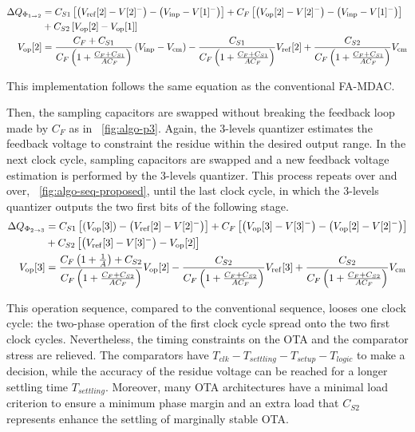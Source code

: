 \begin{align}
 \Delta Q_{\Phi_{1 \rightarrow 2}} &= C_{S1} \left[\left(V_{\rm ref}[2]-V[2]^- \right) - \left(V_{\rm inp}-V[1]^- \right) \right] + C_{F} \left[\left(V_{\rm op}[2]-V[2]^- \right) - \left(V_{\rm inp}-V[1]^- \right) \right] \\
 &+ C_{S2} \left[V_{\rm op}[2]-V_{\rm op}[1] \right] \nonumber \\
 V_{\rm op}[2] &= \frac{C_F + C_{S1}}{C_F\left(1+\frac{C_F+C_{S1}}{AC_F} \right)} \left(V_{\rm inp}-V_{\rm cm} \right) - \frac{C_{S1}}{C_F\left(1+\frac{C_F+C_{S1}}{AC_F} \right)} V_{\rm ref}[2] + \frac{C_{S2}}{C_F\left(1+\frac{C_F+C_{S1}}{AC_F} \right)} V_{\rm cm}
 \label{eqn:algo_res_p2}
\end{align}

This implementation follows the same equation as the conventional FA-MDAC\@.

Then, the sampling capacitors are swapped without breaking the feedback loop made by \(C_F\) as in \figurename~\ref{fig:algo-p3}. Again, the 3-levels quantizer estimates the feedback voltage to constraint the residue within the desired output range. In the next clock cycle, sampling capacitors are swapped and a new feedback voltage estimation is performed by the 3-levels quantizer. This process repeats over and over, \figurename~\ref{fig:algo-seq-proposed}, until the last clock cycle, in which the 3-levels quantizer outputs the two first bits of the following stage.
\rm
\begin{align}
	\Delta Q_{\Phi_{2 \rightarrow 3}} &= C_{S1} \left[\left(V_{\rm op}[3] \right) - \left(V_{\rm ref}[2]-V[2]^- \right) \right] + C_{F} \left[\left(V_{\rm op}[3]-V[3]^- \right) - \left(V_{\rm op}[2]-V[2]^- \right) \right] \\
	&+ C_{S2} \left[\left(V_{\rm ref}[3] - V[3]^- \right) - V_{\rm op}[2] \right] \nonumber \\
	V_{\rm op}[3] &= \frac{C_F\left(1+\frac{1}{A}\right) + C_{S2}}{C_F\left(1+\frac{C_F+C_{S2}}{AC_F} \right)} V_{\rm op}[2] - \frac{C_{S2}}{C_F\left(1+\frac{C_F+C_{S2}}{AC_F} \right)} V_{\rm ref}[3] + \frac{C_{S2}}{C_F\left(1+\frac{C_F+C_{S2}}{AC_F} \right)} V_{\rm cm}
	\label{eqn:algo_res_p3}
   \end{align}

This operation sequence, compared to the conventional sequence, looses one clock cycle: the two-phase operation of the first clock cycle spread onto the two first clock cycles. Nevertheless, the timing constraints on the OTA and the comparator stress are relieved. The comparators have \(T_{clk}-T_{settling}-T_{setup}-T_{logic}\) to make a decision, while the accuracy of the residue voltage can be reached for a longer settling time \(T_{settling}\). Moreover, many OTA architectures have a minimal load criterion to ensure a minimum phase margin and an extra load that \(C_{S2}\) represents enhance the settling of marginally stable OTA\@.


